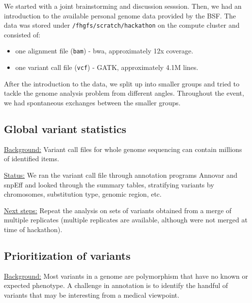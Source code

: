 \documentclass[a4paper,11pt]{TKnotes}
\newcommand{\background}{\vspace*{0.3cm}\noindent\uline{Background:} }
\newcommand{\status}{\vspace*{0.3cm}\noindent\uline{Status:} }
\newcommand{\nextsteps}{\vspace*{0.3cm}\noindent\uline{Next steps:} }
\begin{document}
We started with a joint brainstorming and discussion sesssion. Then, we had an introduction to the available personal genome data provided by the BSF. The data was stored under {\tt /fhgfs/scratch/hackathon} on the compute cluster and consisted of:
\begin{itemize}
 \item[] one alignment file ({\tt bam}) - bwa, approximately 12x coverage.
 \item[] one variant call file ({\tt vcf}) - GATK, approximately 4.1M lines.
\end{itemize}
After the introduction to the data, we split up into smaller groups and tried to tackle the genome analysis problem from different angles. Throughout the event, we had spontaneous exchanges between the smaller groups.

\vspace*{0.5cm}




\vspace*{0.5cm}
\subsection{Global variant statistics}

\background Variant call files for whole genome sequencing can contain millions of identified items.

\status We ran the variant call file through annotation programs Annovar and snpEff and looked through the summary tables, stratifying variants by chromosomes, substitution type, genomic region, etc.

\nextsteps Repeat the analysis on sets of variants obtained from a merge of multiple replicates (multiple replicates are available, although were not merged at time of hackathon). 



\vspace*{0.5cm}
\subsection{Prioritization of variants}

\background Most variants in a genome are polymorphism that have no known or expected phenotype. A challenge in annotation is to identify the handful of variants that may be interesting from a medical viewpoint.
\end{document}
